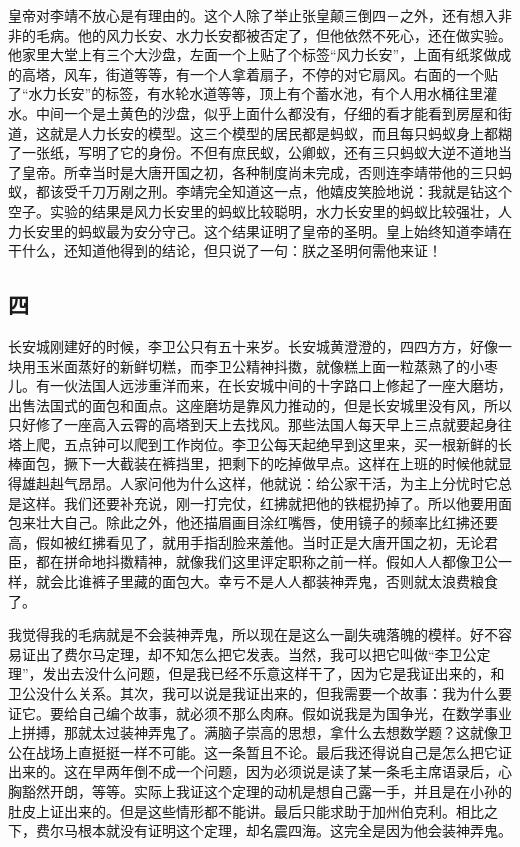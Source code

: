 皇帝对李靖不放心是有理由的。这个人除了举止张皇颠三倒四－之外，还有想入非非的毛病。他的风力长安、水力长安都被否定了，但他依然不死心，还在做实验。他家里大堂上有三个大沙盘，左面一个上贴了个标签“风力长安”，上面有纸浆做成的高塔，风车，街道等等，有一个人拿着扇子，不停的对它扇风。右面的一个贴了“水力长安”的标签，有水轮水道等等，顶上有个蓄水池，有个人用水桶往里灌水。中间一个是土黄色的沙盘，似乎上面什么都没有，仔细的看才能看到房屋和街道，这就是人力长安的模型。这三个模型的居民都是蚂蚁，而且每只蚂蚁身上都糊了一张纸，写明了它的身份。不但有庶民蚁，公卿蚁，还有三只蚂蚁大逆不道地当了皇帝。所幸当时是大唐开国之初，各种制度尚未完成，否则连李靖带他的三只蚂蚁，都该受千刀万剐之刑。李靖完全知道这一点，他嬉皮笑脸地说：我就是钻这个空子。实验的结果是风力长安里的蚂蚁比较聪明，水力长安里的蚂蚁比较强壮，人力长安里的蚂蚁最为安分守己。这个结果证明了皇帝的圣明。皇上始终知道李靖在干什么，还知道他得到的结论，但只说了一句：朕之圣明何需他来证！ 

\subsection{四} 

长安城刚建好的时候，李卫公只有五十来岁。长安城黄澄澄的，四四方方，好像一块用玉米面蒸好的新鲜切糕，而李卫公精神抖擞，就像糕上面一粒蒸熟了的小枣儿。有一伙法国人远涉重洋而来，在长安城中间的十字路口上修起了一座大磨坊，出售法国式的面包和面点。这座磨坊是靠风力推动的，但是长安城里没有风，所以只好修了一座高入云霄的高塔到天上去找风。那些法国人每天早上三点就要起身往塔上爬，五点钟可以爬到工作岗位。李卫公每天起绝早到这里来，买一根新鲜的长棒面包，撅下一大截装在裤挡里，把剩下的吃掉做早点。这样在上班的时候他就显得雄赳赳气昂昂。人家问他为什么这样，他就说：给公家干活，为主上分忧时它总是这样。我们还要补充说，刚一打完仗，红拂就把他的铁棍扔掉了。所以他要用面包来壮大自己。除此之外，他还描眉画目涂红嘴唇，使用镜子的频率比红拂还要高，假如被红拂看见了，就用手指刮脸来羞他。当时正是大唐开国之初，无论君臣，都在拼命地抖擞精神，就像我们这里评定职称之前一样。假如人人都像卫公一样，就会比谁裤子里藏的面包大。幸亏不是人人都装神弄鬼，否则就太浪费粮食了。 

我觉得我的毛病就是不会装神弄鬼，所以现在是这么一副失魂落魄的模样。好不容易证出了费尔马定理，却不知怎么把它发表。当然，我可以把它叫做“李卫公定理”，发出去没什么问题，但是我已经不乐意这样干了，因为它是我证出来的，和卫公没什么关系。其次，我可以说是我证出来的，但我需要一个故事：我为什么要证它。要给自己编个故事，就必须不那么肉麻。假如说我是为国争光，在数学事业上拼搏，那就太过装神弄鬼了。满脑子崇高的思想，拿什么去想数学题？这就像卫公在战场上直挺挺一样不可能。这一条暂且不论。最后我还得说自己是怎么把它证出来的。这在早两年倒不成一个问题，因为必须说是读了某一条毛主席语录后，心胸豁然开朗，等等。实际上我证这个定理的动机是想自己露一手，并且是在小孙的肚皮上证出来的。但是这些情形都不能讲。最后只能求助于加州伯克利。相比之下，费尔马根本就没有证明这个定理，却名震四海。这完全是因为他会装神弄鬼。 

